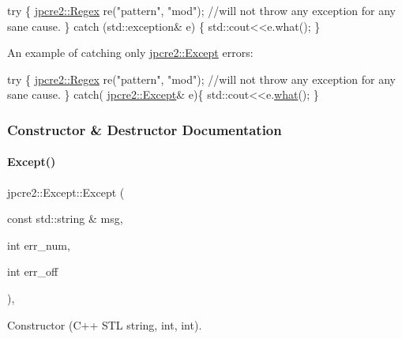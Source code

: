 \begin{DoxyCode}
\textcolor{keywordflow}{try} \{
    \hyperlink{classjpcre2_1_1Regex}{jpcre2::Regex} re(\textcolor{stringliteral}{"pattern"}, \textcolor{stringliteral}{"mod"}); \textcolor{comment}{//will not throw any exception for any sane cause.}
\} \textcolor{keywordflow}{catch} (std::exception& e) \{
    std::cout<<e.what();
\}
\end{DoxyCode}


An example of catching only \hyperlink{classjpcre2_1_1Except}{jpcre2\+::\+Except} errors\+:


\begin{DoxyCode}
\textcolor{keywordflow}{try} \{
    \hyperlink{classjpcre2_1_1Regex}{jpcre2::Regex} re(\textcolor{stringliteral}{"pattern"}, \textcolor{stringliteral}{"mod"}); \textcolor{comment}{//will not throw any exception for any sane cause.}
\}
\textcolor{keywordflow}{catch}( \hyperlink{classjpcre2_1_1Except}{jpcre2::Except}& e)\{
    std::cout<<e.\hyperlink{classjpcre2_1_1Except_aa16bdec8432ee950955f7ad81a9655bb_aa16bdec8432ee950955f7ad81a9655bb}{what}();
\}
\end{DoxyCode}
 

\subsubsection{Constructor \& Destructor Documentation}
\hypertarget{classjpcre2_1_1Except_a302b67f0fbc5f906bac67a4572ff29ec_a302b67f0fbc5f906bac67a4572ff29ec}{}\label{classjpcre2_1_1Except_a302b67f0fbc5f906bac67a4572ff29ec_a302b67f0fbc5f906bac67a4572ff29ec} 
\paragraph{\texorpdfstring{Except()}{Except()}}
{\footnotesize\ttfamily jpcre2\+::\+Except\+::\+Except (\begin{DoxyParamCaption}\item[{const std\+::string \&}]{msg,  }\item[{int}]{err\+\_\+num,  }\item[{int}]{err\+\_\+off }\end{DoxyParamCaption})\hspace{0.3cm}{\ttfamily [inline]}, {\ttfamily [explicit]}}



Constructor (C++ S\+TL string, int, int). 



